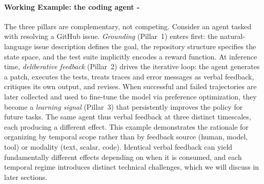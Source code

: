 \paragraph{Working Example: the coding agent - }
The three pillars are complementary, not competing. Consider an agent \citep{wang2025openhands} tasked with resolving a GitHub issue. \emph{Grounding} (Pillar~1) enters first: the natural-language issue description defines the goal, the repository structure specifies the state space, and the test suite implicitly encodes a reward function. At inference time, \emph{deliberative feedback} (Pillar~2) drives the iterative loop: the agent generates a patch, executes the tests, treats traces and error messages as verbal feedback, critiques its own output, and revises. When successful and failed trajectories are later collected and used to fine-tune the model via preference optimization, they become a \emph{learning signal} (Pillar~3) that persistently improves the policy for future tasks. The same agent thus  verbal feedback at three distinct timescales, each producing a different effect. This example demonstrates the rationale for organizing by temporal scope rather than by feedback source (human, model, tool) or modality (text, scalar, code). Identical verbal feedback can yield fundamentally different effects depending on when it is consumed, and each temporal regime introduces distinct technical challenges, which we will discuss in later sections. 
 
